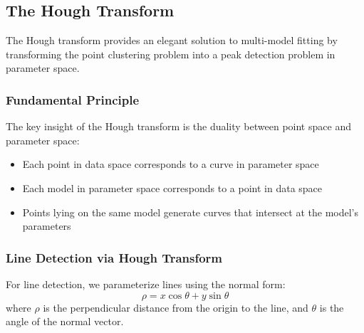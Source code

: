 \documentclass[12pt]{article}
\begin{document}
\subsection{The Hough Transform}
\label{subsec:hough_transform}

The Hough transform provides an elegant solution to multi-model fitting by transforming the point clustering problem into a peak detection problem in parameter space.

\subsubsection{Fundamental Principle}
\label{subsubsec:hough_principle}

The key insight of the Hough transform is the duality between point space and parameter space:
\begin{itemize}
    \item Each point in data space corresponds to a curve in parameter space
    \item Each model in parameter space corresponds to a point in data space
    \item Points lying on the same model generate curves that intersect at the model's parameters
\end{itemize}

\subsubsection{Line Detection via Hough Transform}
\label{subsubsec:hough_lines}

For line detection, we parameterize lines using the normal form:
\begin{equation}
    \rho = x \cos \theta + y \sin \theta
    \label{eq:line_normal_form}
\end{equation}
where $\rho$ is the perpendicular distance from the origin to the line, and $\theta$ is the angle of the normal vector.
\end{document}
